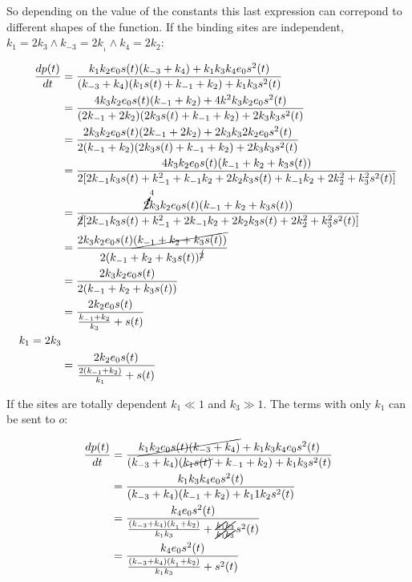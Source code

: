     So depending on the value of the constants this last expression can correpond to different shapes of the function.
    If the binding sites are independent, $k_1 = 2k_3\land k_{-3} = 2k_{_1}\land k_4 = 2k_2$:

    \begin{align*}
      \frac{dp(t)}{dt} &= \frac{k_1k_2e_0s(t)(k_{-3}+k_4) + k_1k_3k_4e_0s^2(t)}{(k_{-3}+k_4)(k_1s(t) + k_{-1} + k_2)+ k_1k_3s^2(t)}\\
                       &= \frac{4k_3k_2e_0s(t)(k_{-1}+k_2) + 4k^2k_3k_2e_0s^2(t)}{(2k_{-1}+2k_2)(2k_3s(t) + k_{-1} + k_2)+ 2k_3k_3s^2(t)}\\
                       &= \frac{2k_3k_2e_0s(t)(2k_{-1}+2k_2) + 2k_3k_32k_2e_0s^2(t)}{2(k_{-1}+k_2)(2k_3s(t) + k_{-1} + k_2)+ 2k_3k_3s^2(t)}\\
                       &= \frac{4k_3k_2e_0s(t)(k_{-1} + k_2 + k_3s(t))}{2[2k_{-1}k_3s(t) + k_{-1}^2 + k_{-1}k_2 + 2k_{2}k_3s(t) + k_{-1}k_2 + 2k^2_2 + k^2_3s^2(t)]}\\
                       &= \frac{\cancelto{4}{2}k_3k_2e_0s(t)(k_{-1} + k_2 + k_3s(t))}{\cancel{2}[2k_{-1}k_3s(t) + k_{-1}^2 + 2k_{-1}k_2 + 2k_{2}k_3s(t) + 2k^2_2 + k^2_3s^2(t)]}\\
                       &= \frac{2k_3k_2e_0s(t)\cancel{(k_{-1} + k_2 + k_3s(t))}}{2(k_{-1} + k_2 + k_3s(t))^{\cancel{2}}}\\
                       &= \frac{2k_3k_2e_0s(t)}{2(k_{-1} + k_2 + k_3s(t))}\\
                       &= \frac{2k_2e_0s(t)}{\frac{k_{-1}+k_2}{k_3} + s(t)}\\
            k_1 = 2k_3 &\\
                       &= \frac{2k_2e_0s(t)}{\frac{2(k_{-1}+k_2)}{k_1} + s(t)}\\
    \end{align*}

    If the sites are totally dependent $k_1\ll 1$ and $k_3\gg 1$.
    The terms with only $k_1$ can be sent to $o$:

    \begin{align*}
      \frac{dp(t)}{dt} &= \frac{\cancel{k_1k_2e_0s(t)(k_{-3}+k_4)} + k_1k_3k_4e_0s^2(t)}{(k_{-3}+k_4)(\cancel{k_1s(t)} + k_{-1} + k_2)+ k_1k_3s^2(t)}\\
                       &= \frac{k_1k_3k_4e_0s^2(t)}{(k_{-3}+k_4)(k_{-1}+k_2) + k_11k_2s^2(t)}\\
                       &= \frac{k_4e_0s^{2}(t)}{\frac{(k_{-3}+k_4)(k_{_1}+k_2)}{k_1k_3} + \frac{\cancel{k_1}\cancel{k_3}}{\cancel{k_1}\cancel{k_3}}s^2(t)}\\
                       &= \frac{k_4e_0s^{2}(t)}{\frac{(k_{-3}+k_4)(k_{_1}+k_2)}{k_1k_3} + s^2(t)}\\
    \end{align*}

